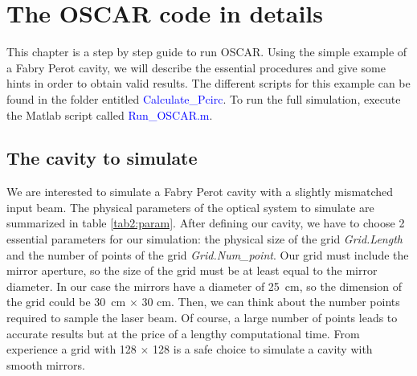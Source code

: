 \chapter{The OSCAR code in details}
\label{chap2}
This chapter is a step by step guide to run OSCAR. Using the simple example of a Fabry Perot cavity, we will describe the essential procedures and give some hints in order to obtain valid results. The different scripts for this example can be found in the folder entitled \textcolor{blue}{Calculate\_Pcirc}. To run the full simulation, execute the Matlab script called \textcolor{blue}{Run\_OSCAR.m}.

\section{The cavity to simulate}
\label{chap2:1}
We are interested to simulate a Fabry Perot cavity with a slightly mismatched input beam. The physical parameters of the optical system to simulate are summarized in table \ref{tab2:param}. After defining our cavity, we have to choose 2 essential parameters for our simulation: the physical size of the grid \textsl{Grid.Length} and the number of points of the grid \textsl{Grid.Num\_point}. Our grid must include the mirror aperture, so the size of the grid must be at least equal to the mirror diameter. In our case the mirrors have a diameter of 25~cm, so the dimension of the grid could be 30~cm $\times$ 30 cm. Then, we can think about the number points required to sample the laser beam. Of course, a large number of points leads to accurate results but at the price of a lengthy computational time. From experience a grid with 128 $\times$ 128 is a safe choice to simulate a cavity with smooth mirrors.

